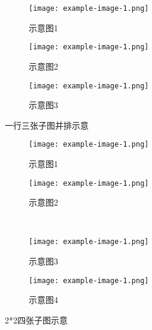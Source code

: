 \documentclass[zihao=-4]{ctexart}
\begin{document}
\begin{spacing}{1.5}
\begin{figure}[htbp]
  \begin{subfigure}{0.31\textwidth}
    \texttt{[image: example-image-1.png]}
    \caption{示意图1} \label{fig:9aaa}
  \end{subfigure}%
  \hspace*{\fill}   %
  \begin{subfigure}{0.31\textwidth}
    \texttt{[image: example-image-1.png]}
    \caption{示意图2} \label{fig:9bbb}
  \end{subfigure}
  \hspace*{\fill}   %
  \begin{subfigure}{0.31\textwidth}
    \texttt{[image: example-image-1.png]}
    \caption{示意图3} \label{fig:9ccc}
    \end{subfigure}
\caption{一行三张子图并排示意}
\label{qmix-train}
\end{figure}


\begin{figure}[htbp]
  \begin{subfigure}{0.48\textwidth}
    \texttt{[image: example-image-1.png]}
    \caption{示意图1} \label{fig:8a}
  \end{subfigure}%
  \hspace*{\fill}   %
  \begin{subfigure}{0.48\textwidth}
    \texttt{[image: example-image-1.png]}
    \caption{示意图2} \label{fig:8b}
  \end{subfigure}\\
  \begin{subfigure}{0.48\textwidth}
    \texttt{[image: example-image-1.png]}
    \caption{示意图3} \label{fig:8c}
  \end{subfigure}
  \hspace*{\fill}   %
  \begin{subfigure}{0.48\textwidth}
    \texttt{[image: example-image-1.png]}
    \caption{示意图4} \label{fig:8d}
  \end{subfigure}
\caption{2*2四张子图示意} \label{fig:8}
\end{figure}


\end{spacing}
\end{document}
